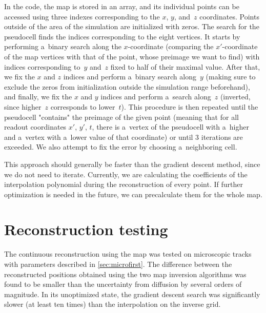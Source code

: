 			In the code, the map is stored in an array, and its individual points can be accessed using three indexes corresponding to the $x$, $y$, and~$z$ coordinates. Points outside of the area of the simulation are initialized with zeros. The search for the pseudocell finds the indices corresponding to the eight vertices. It starts by performing a~binary search along the $x$\nobreakdash-coordinate (comparing the $x'$\nobreakdash-coordinate of the map vertices with that of the point, whose preimage we want to find) with indices corresponding to~$y$ and~$z$ fixed to half of their maximal value. After that, we fix the $x$ and $z$ indices and perform a~binary search along~$y$ (making sure to exclude the zeros from initialization outside the simulation range beforehand), and finally, we fix the $x$ and $y$ indices and perform a~search along~$z$ (inverted, since higher~$z$ corresponds to lower~$t$). This procedure is then repeated until the pseudocell "contains" the preimage of the given point (meaning that for all readout coordinates $x'$, $y'$, $t$, there is a~vertex of the pseudocell with a~higher and a~vertex with a~lower value of that coordinate) or until 3 iterations are exceeded. We also attempt to fix the error by choosing a~neighboring cell.
			
			This approach should generally be faster than the gradient descent method, since we do not need to iterate. Currently, we are calculating the coefficients of the interpolation polynomial during the reconstruction of every point. If further optimization is needed in the future, we can precalculate them for the whole map.
			
		\section{Reconstruction testing}
			The continuous reconstruction using the map was tested on microscopic tracks with parameters described in \cref{sec:microfirst}. The difference between the reconstructed positions obtained using the two map inversion algorithms was found to be smaller than the uncertainty from diffusion by several orders of magnitude. In its unoptimized state, the gradient descent search was significantly slower (at least ten times) than the interpolation on the inverse grid.
			
